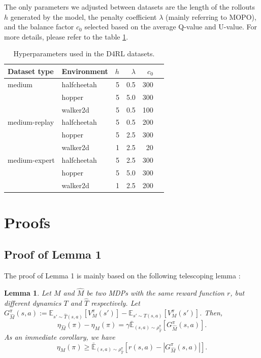 \documentclass[conference]{IEEEtran}
\newtheorem{lemma}{Lemma}
\begin{document}
The only parameters we adjusted between datasets are the length of the rollouts $h$ generated by the model, the penalty coefficient $\lambda$ (mainly referring to MOPO), and the balance factor $c_0$ selected based on the average Q-value and U-value. For more details, please refer to the table \ref{tab:hyper}.

\begin{table}[!ht]
  \centering
  \begin{tabular}{llrrrr}
    \toprule
    \textbf{Dataset type} & \textbf{Environment} & $h$ & $\lambda$ & $c_0$\\
    \midrule
    medium & halfcheetah  & 5 & 0.5 & 300\\
           & hopper  & 5 & 5.0 & 300\\
           & walker2d  & 5 & 0.5 & 100\\

    medium-replay & halfcheetah  & 5 & 0.5 & 200\\
            & hopper & 5 & 2.5 & 300\\
            & walker2d & 1 & 2.5 & 20\\

    medium-expert & halfcheetah  & 5 & 2.5 & 300\\
            & hopper  & 5 & 5.0 & 300\\
            & walker2d  & 1 & 2.5 & 200\\
    \bottomrule
  \end{tabular}
  \caption{Hyperparameters used in the D4RL datasets.}
  \label{tab:hyper}
\end{table}

\section{Proofs}
\label{b}
\subsection{Proof of Lemma 1}

The proof of Lemma 1 is mainly based on the following telescoping lemma \cite{mopo}:

\begin{lemma}
Let $M$ and $\hat{M}$ be two MDPs with the same reward function $r$, but different dynamics $T$ and $\hat{T}$ respectively. Let $G^{\pi}_{\hat{M}} (s, a) := \mathbb{E}_{s'\sim\hat{T}(s,a)}  [V^{\pi}_M (s')] - \mathbb{E}_{s'\sim T (s,a)} [V^{\pi}_M (s')]$. Then,
\begin{equation}\eta_{\hat{M}}(\pi) - \eta_M (\pi) = \gamma  \bar{\mathbb{E}}_{(s,a)\sim \rho^{\pi}_{\hat{T}}} [ G^{\pi}_{\hat{M}} (s, a) ].
\label{eq:telescope1}
\end{equation}
As an immediate corollary, we have
\begin{equation}
\eta_M (\pi)  \geq \bar{\mathbb{E}}_{(s,a)\sim \rho^{\pi}_{\hat{T}}} [ r(s,a)- |G^{\pi}_{\hat{M}} (s, a) |].
\label{eq:telescope2}
\end{equation}
\end{lemma}
\end{document}
